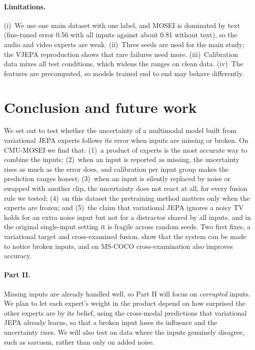 \documentclass[10pt,twocolumn]{article}
\begin{document}
\paragraph{Limitations.} (i)~We use one main dataset with one label, and MOSEI is dominated by text (fine-tuned error
0.56 with all inputs against about 0.81 without text), so the audio and video experts are weak. (ii)~Three seeds are used
for the main study; the VJEPA reproduction shows that rare failures need more. (iii)~Calibration data mixes all test conditions, which widens the ranges on clean data. (iv)~The features are
precomputed, so models trained end to end may behave differently.

\section{Conclusion and future work}
We set out to test whether the uncertainty of a multimodal model built from variational JEPA experts follows its error
when inputs are missing or broken. On CMU-MOSEI we find that:
(1)~a product of experts is the most accurate way to combine the inputs;
(2)~when an input is reported as missing, the uncertainty rises as much as the error does, and calibration per input
group makes the prediction ranges honest;
(3)~when an input is silently replaced by noise or swapped with another clip, the uncertainty does not react at all, for
every fusion rule we tested;
(4)~on this dataset the pretraining method matters only when the experts are frozen; and
(5)~the claim that variational JEPA ignores a noisy TV holds for an extra noise input but not for a distractor shared by
all inputs, and in the original single-input setting it is fragile across random seeds.
Two first fixes, a variational target and cross-examined fusion, show that the system can be made to notice broken
inputs, and on MS-COCO cross-examination also improves accuracy.

\paragraph{Part II.} Missing inputs are already handled well, so Part II will focus on \emph{corrupted} inputs. We plan
to let each expert's weight in the product depend on how surprised the other experts are by its belief, using the
cross-modal predictions that variational JEPA already learns, so that a broken input loses its influence and the
uncertainty rises. We will also test on data where the inputs genuinely disagree, such as sarcasm, rather than only on
added noise.

{\small


}
\end{document}
